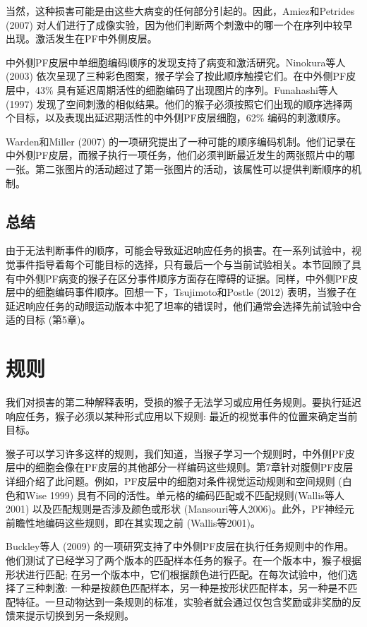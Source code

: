 当然，这种损害可能是由这些大病变的任何部分引起的。因此，Amiez和Petrides (2007) 对人们进行了成像实验，因为他们判断两个刺激中的哪一个在序列中较早出现。激活发生在PF中外侧皮层。

中外侧PF皮层中单细胞编码顺序的发现支持了病变和激活研究。Ninokura等人 (2003) 依次呈现了三种彩色图案，猴子学会了按此顺序触摸它们。在中外侧PF皮层中，43\% 具有延迟周期活性的细胞编码了出现图片的序列。Funahashi等人 (1997) 发现了空间刺激的相似结果。他们的猴子必须按照它们出现的顺序选择两个目标，以及表现出延迟期活性的中外侧PF皮层细胞，62\% 编码的刺激顺序。

Warden和Miller (2007) 的一项研究提出了一种可能的顺序编码机制。他们记录在中外侧PF皮层，而猴子执行一项任务，他们必须判断最近发生的两张照片中的哪一张。第二张图片的活动超过了第一张图片的活动，该属性可以提供判断顺序的机制。
\subsection{总结}
由于无法判断事件的顺序，可能会导致延迟响应任务的损害。在一系列试验中，视觉事件指导着每个可能目标的选择，只有最后一个与当前试验相关。本节回顾了具有中外侧PF病变的猴子在区分事件顺序方面存在障碍的证据。同样，中外侧PF皮层中的细胞编码事件顺序。回想一下，Tsujimoto和Postle (2012) 表明，当猴子在延迟响应任务的动眼运动版本中犯了坦率的错误时，他们通常会选择先前试验中合适的目标 (第5章)。

\section{规则}
我们对损害的第二种解释表明，受损的猴子无法学习或应用任务规则。要执行延迟响应任务，猴子必须以某种形式应用以下规则: 最近的视觉事件的位置来确定当前目标。

猴子可以学习许多这样的规则，我们知道，当猴子学习一个规则时，中外侧PF皮层中的细胞会像在PF皮层的其他部分一样编码这些规则。第7章针对腹侧PF皮层详细介绍了此问题。例如，PF皮层中的细胞对条件视觉运动规则和空间规则 (白色和Wise 1999) 具有不同的活性。单元格的编码匹配或不匹配规则(Wallis等人2001) 以及匹配规则是否涉及颜色或形状 (Mansouri等人2006)。此外，PF神经元前瞻性地编码这些规则，即在其实现之前 (Wallis等2001)。

Buckley等人 (2009) 的一项研究支持了中外侧PF皮层在执行任务规则中的作用。他们测试了已经学习了两个版本的匹配样本任务的猴子。在一个版本中，猴子根据形状进行匹配; 在另一个版本中，它们根据颜色进行匹配。在每次试验中，他们选择了三种刺激: 一种是按颜色匹配样本，另一种是按形状匹配样本，另一种是不匹配特征。一旦动物达到一条规则的标准，实验者就会通过仅包含奖励或非奖励的反馈来提示切换到另一条规则。


